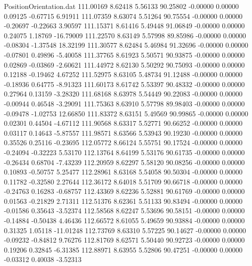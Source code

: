 \begin{filecontents}{PositionOrientation.dat}
 111.00169    8.62418    5.56133    90.25802   -0.00000    0.00000    0.09125   -0.67715    6.91911
 111.07359    8.63074    5.51264    90.75554   -0.00000    0.00000   -0.20697   -0.22663    3.90597
 111.15371    8.61416    5.49448    91.06849   -0.00000    0.00000    0.24075    1.18769  -16.79009
 111.22570    8.63149    5.57998    89.85986   -0.00000    0.00000   -0.08304   -1.37548   18.32199
 111.30577    8.62484    5.46984    91.32696   -0.00000    0.00000   -0.07801    0.49896   -5.40058
 111.37765    8.61923    5.50571    90.93875   -0.00000    0.00000    0.02869   -0.03869   -2.60621
 111.44972    8.62130    5.50292    90.75093   -0.00000    0.00000    0.12188   -0.19462    4.67252
 111.52975    8.63105    5.48734    91.12488   -0.00000    0.00000   -0.18936    0.64775   -8.91323
 111.60173    8.61742    5.53397    90.48332   -0.00000    0.00000    0.27964    0.13159   -3.28320
 111.68168    8.63978    5.54449    90.22083   -0.00000    0.00000   -0.00944    0.46548   -3.29091
 111.75363    8.63910    5.57798    89.98403   -0.00000    0.00000   -0.09478   -1.02753   12.66850
 111.83372    8.63151    5.49569    90.99865   -0.00000    0.00000    0.02301    0.44504   -4.67112
 111.90568    8.63317    5.52771    90.66252   -0.00000    0.00000    0.03117    0.14643   -5.87557
 111.98571    8.63566    5.53943    90.19230   -0.00000    0.00000    0.35526    0.25116   -0.23695
 112.05772    8.66124    5.55751    90.17524   -0.00000    0.00000   -0.24094   -0.32223    5.53170
 112.13764    8.64199    5.53176    90.61735   -0.00000    0.00000   -0.26434    0.68704   -7.43239
 112.20959    8.62297    5.58120    90.08256   -0.00000    0.00000    0.10893   -0.50757    5.25477
 112.28961    8.63168    5.54058    90.50304   -0.00000    0.00000    0.11782   -0.32580    2.27644
 112.36172    8.64018    5.51709    90.66718   -0.00000    0.00000   -0.24763    0.16283   -0.68757
 112.43369    8.62236    5.52881    90.61769   -0.00000    0.00000    0.01563   -0.21829    2.71311
 112.51376    8.62361    5.51133    90.83494   -0.00000    0.00000   -0.01586    0.35643   -3.52374
 112.58568    8.62247    5.53696    90.58151   -0.00000    0.00000   -0.14884   -0.50438    4.46436
 112.66572    8.61055    5.49659    90.93884   -0.00000    0.00000    0.31325    1.05118  -11.01248
 112.73769    8.63310    5.57225    90.14627   -0.00000    0.00000   -0.09232   -0.84812    9.76276
 112.81769    8.62571    5.50440    90.92723   -0.00000    0.00000    0.19206    0.32845   -6.31385
 112.88971    8.63955    5.52806    90.47251   -0.00000    0.00000   -0.03312    0.40038   -3.52313

\end{filecontents}

